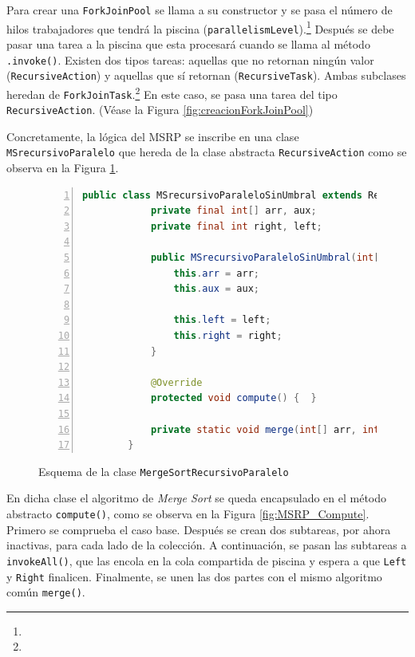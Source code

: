 \documentclass[titlepage]{article}
\begin{document}
Para crear una \lstinline{ForkJoinPool} se llama a su constructor y se pasa el número de hilos trabajadores que tendrá la piscina (\lstinline{parallelismLevel}).\footnote[17]{} Después se debe pasar una tarea a la piscina que esta procesará cuando se llama al método \lstinline{.invoke()}. Existen dos tipos tareas: aquellas que no retornan ningún valor (\lstinline{RecursiveAction}) y aquellas que sí retornan (\lstinline{RecursiveTask}). Ambas subclases heredan de \lstinline{ForkJoinTask}.\footnote[17]{} En este caso, se pasa una tarea del tipo \lstinline{RecursiveAction}. (Véase la Figura \ref{fig:creacionForkJoinPool})

Concretamente, la lógica del MSRP se inscribe en una clase \lstinline{MSrecursivoParalelo} que hereda de la clase abstracta \lstinline{RecursiveAction} como se observa en la Figura \ref{fig:MSRP_RecursiveAction}. 

\begin{figure}[h]
	\begin{lstlisting}[language=java, frame=single, numbers=left]
		public class MSrecursivoParaleloSinUmbral extends RecursiveAction {
			private final int[] arr, aux;
			private final int right, left;
			
			public MSrecursivoParaleloSinUmbral(int[] arr, int[] aux, int left, int right) {
				this.arr = arr;
				this.aux = aux;
				
				this.left = left;
				this.right = right;
			}
			
			@Override
			protected void compute() {	}
			
			private static void merge(int[] arr, int[] aux, int left, int mid, int right) {	}	
		}    	
	\end{lstlisting}
	\caption{Esquema de la clase \lstinline{MergeSortRecursivoParalelo}}
	\label{fig:MSRP_RecursiveAction}
\end{figure}

En dicha clase el algoritmo de \textit{Merge Sort} se queda encapsulado en el método abstracto \lstinline{compute()}, como se observa en la Figura \ref{fig:MSRP_Compute}. Primero se comprueba el caso base. Después se crean dos subtareas, por ahora inactivas, para cada lado de la colección. A continuación, se pasan las subtareas a \lstinline{invokeAll()}, que las encola en la cola compartida de piscina y espera a que \lstinline{Left} y \lstinline{Right} finalicen. Finalmente, se unen las dos partes con el mismo algoritmo común \lstinline{merge()}.
\end{document}

